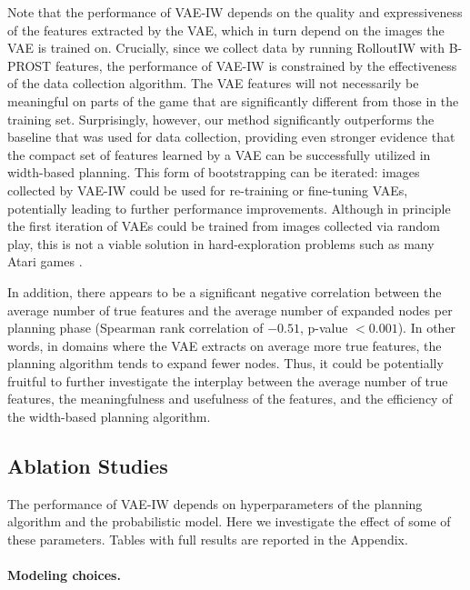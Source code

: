 Note that the performance of VAE-IW depends on the quality and expressiveness of the features extracted by the VAE, which in turn depend on the images the VAE is trained on. Crucially, since we collect data by running RolloutIW with B-PROST features, the performance of VAE-IW is constrained by the effectiveness of the data collection algorithm. The VAE features will not necessarily be meaningful on parts of the game that are significantly different from those in the training set. Surprisingly, however, our method significantly outperforms the baseline that was used for data collection, providing even stronger evidence that the compact set of features learned by a VAE can be successfully utilized in width-based planning.
This form of bootstrapping can be iterated: images collected by VAE-IW could be used for re-training or fine-tuning VAEs, potentially leading to further performance improvements. Although in principle the first iteration of VAEs could be trained from images collected via random play, this is not a viable solution in hard-exploration problems such as many Atari games \cite{ecoffet2019go}.

In addition, there appears to be a significant negative correlation between the average number of true features and the average number of expanded nodes per planning phase (Spearman rank correlation of $-0.51$, p-value $< 0.001$). In other words, in domains where the VAE extracts on average more true features, the planning algorithm tends to expand fewer nodes. Thus, it could be potentially fruitful to further investigate the interplay between the average number of true features, the meaningfulness and usefulness of the features, and the efficiency of the width-based planning algorithm.


\subsection{Ablation Studies}

The performance of VAE-IW depends on hyperparameters of the planning algorithm and the probabilistic model.  Here we investigate the effect of some of these parameters. Tables with full results are reported in the Appendix.

\paragraph{Modeling choices.}

